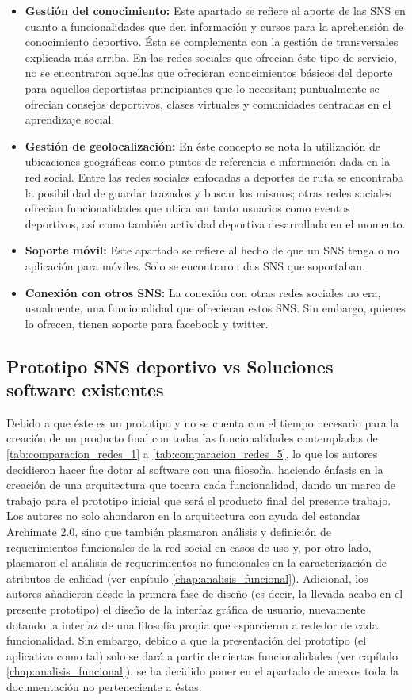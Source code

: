\begin{itemize}
	\item \textbf{Gestión del conocimiento:} Este apartado se refiere al aporte de las SNS en cuanto a funcionalidades que den información y cursos para la aprehensión de conocimiento deportivo. Ésta se complementa con la gestión de transversales explicada más arriba. En las redes sociales que ofrecian éste tipo de servicio, no se encontraron aquellas que ofrecieran conocimientos básicos del deporte para aquellos deportistas principiantes que lo necesitan; puntualmente se ofrecian consejos deportivos, clases virtuales y comunidades centradas en el aprendizaje social.
	\item \textbf{Gestión de geolocalización:} En éste concepto se nota la utilización de ubicaciones geográficas como puntos de referencia e información dada en la red social. Entre las redes sociales enfocadas a deportes de ruta se encontraba la posibilidad de guardar trazados y buscar los mismos; otras redes sociales ofrecian funcionalidades que ubicaban tanto usuarios como eventos deportivos, así como también actividad deportiva desarrollada en el momento.
	\item \textbf{Soporte móvil:} Este apartado se refiere al hecho de que un SNS tenga o no aplicación para móviles. Solo se encontraron dos SNS que soportaban.
	\item \textbf{Conexión con otros SNS:} La conexión con otras redes sociales no era, usualmente, una funcionalidad que ofrecieran estos SNS. Sin embargo, quienes lo ofrecen, tienen soporte para facebook y twitter.
\end{itemize}

\subsection{Prototipo SNS deportivo vs Soluciones software existentes}

Debido a que éste es un prototipo y no se cuenta con el tiempo necesario para la creación de un producto final con todas las funcionalidades contempladas de \ref{tab:comparacion_redes_1} a \ref{tab:comparacion_redes_5}, lo que los autores decidieron hacer fue dotar al software con una filosofía, haciendo énfasis en la creación de una arquitectura que tocara cada funcionalidad, dando un marco de trabajo para el prototipo inicial que será el producto final del presente trabajo. Los autores no solo ahondaron en la arquitectura con ayuda del estandar Archimate 2.0, sino que también plasmaron análisis y definición de requerimientos funcionales de la red social en casos de uso y, por otro lado, plasmaron el análisis de requerimientos no funcionales en la caracterización de atributos de calidad (ver capítulo \ref{chap:analisis_funcional}). Adicional, los autores añadieron desde la primera fase de diseño (es decir, la llevada acabo en el presente prototipo) el diseño de la interfaz gráfica de usuario, nuevamente dotando la interfaz de una filosofía propia que esparcieron alrededor de cada funcionalidad. Sin embargo, debido a que la presentación del prototipo (el aplicativo como tal) solo se dará a partir de ciertas funcionalidades (ver capítulo \ref{chap:analisis_funcional}), se ha decidido poner en el apartado de anexos toda la documentación no perteneciente a éstas.

